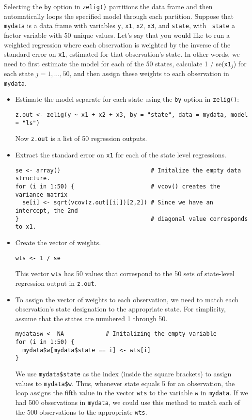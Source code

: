 Selecting the {\tt by} option in {\tt zelig()} partitions the data
frame and then automatically loops the specified model through each
partition.  Suppose that {\tt mydata} is a data frame with variables
{\tt y}, {\tt x1}, {\tt x2}, {\tt x3}, and {\tt state}, with {\tt
state} a factor variable with 50 unique values.  Let's say that you
would like to run a weighted regression where each observation is
weighted by the inverse of the standard error on {\tt x1}, estimated
for that observation's state.  In other words, we need 
to first estimate the model for each of the 50 states, calculate 1 /
{\sc se}({\tt x1}$_j$) for each state $j = 1, \dots, 50$, and then
assign these weights to each observation in {\tt mydata}.    
\begin{itemize}
\item Estimate the model separate for each state using the {\tt by}
option in {\tt zelig()}:  
\begin{verbatim}
z.out <- zelig(y ~ x1 + x2 + x3, by = "state", data = mydata, model = "ls")
\end{verbatim}
Now {\tt z.out} is a list of 50 regression outputs.  
\item Extract the standard error on {\tt x1} for each of the state
level regressions.  
\begin{verbatim}
se <- array()                          # Initalize the empty data structure.
for (i in 1:50) {                      # vcov() creates the variance matrix
  se[i] <- sqrt(vcov(z.out[[i]])[2,2]) # Since we have an intercept, the 2nd 
}                                      # diagonal value corresponds to x1.
\end{verbatim}
\item Create the vector of weights.  
\begin{verbatim}
wts <- 1 / se
\end{verbatim}
This vector {\tt wts} has 50 values that correspond to the 50 sets of
state-level regression output in {\tt z.out}.  
\item To assign the vector of weights to each observation, we need to
match each observation's state designation to the appropriate state.
For simplicity, assume that the states are numbered 1 through 50.
\begin{verbatim}
mydata$w <- NA            # Initalizing the empty variable
for (i in 1:50) { 
  mydata$w[mydata$state == i] <- wts[i]
} 
\end{verbatim} %
We use {\tt mydata\$state} as the index (inside the square brackets)
to assign values to {\tt mydata\$w}.  Thus, whenever state equals 5
for an observation, the loop assigns the fifth value in the vector
{\tt wts} to the variable {\tt w} in {\tt mydata}.  If we had 500
observations in {\tt mydata}, we could use this method to match each
of the 500 observations to the appropriate {\tt wts}.


\end{itemize}
